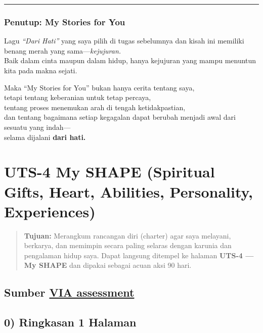 \documentclass[
  letterpaper,
  DIV=11,
  numbers=noendperiod]{scrreprt}
\begin{document}
\begin{center}\rule{0.5\linewidth}{0.5pt}\end{center}

\subsection{\texorpdfstring{\textbf{Penutup: My Stories for
You}}{Penutup: My Stories for You}}\label{penutup-my-stories-for-you}

Lagu \emph{``Dari Hati''} yang saya pilih di tugas sebelumnya dan kisah
ini memiliki benang merah yang sama---\emph{kejujuran.}\\
Baik dalam cinta maupun dalam hidup, hanya kejujuran yang mampu menuntun
kita pada makna sejati.

Maka ``My Stories for You'' bukan hanya cerita tentang saya,\\
tetapi tentang keberanian untuk tetap percaya,\\
tentang proses menemukan arah di tengah ketidakpastian,\\
dan tentang bagaimana setiap kegagalan dapat berubah menjadi awal dari
sesuatu yang indah---\\
selama dijalani \textbf{dari hati.}


\chapter{UTS-4 My SHAPE (Spiritual Gifts, Heart, Abilities, Personality,
Experiences)}\label{uts-4-my-shape-spiritual-gifts-heart-abilities-personality-experiences}

\begin{quote}
\textbf{Tujuan:} Merangkum rancangan diri (charter) agar saya melayani,
berkarya, dan memimpin secara paling selaras dengan karunia dan
pengalaman hidup saya. Dapat langsung ditempel ke halaman \textbf{UTS-4
--- My SHAPE} dan dipakai sebagai acuan aksi 90 hari.
\end{quote}

\section{\texorpdfstring{Sumber
\href{StrengthsProfile-Muhammad-Farrel.pdf}{VIA
assessment}}{Sumber VIA assessment}}\label{sumber-via-assessment}

\section{0) Ringkasan 1 Halaman}\label{ringkasan-1-halaman}
\end{document}
